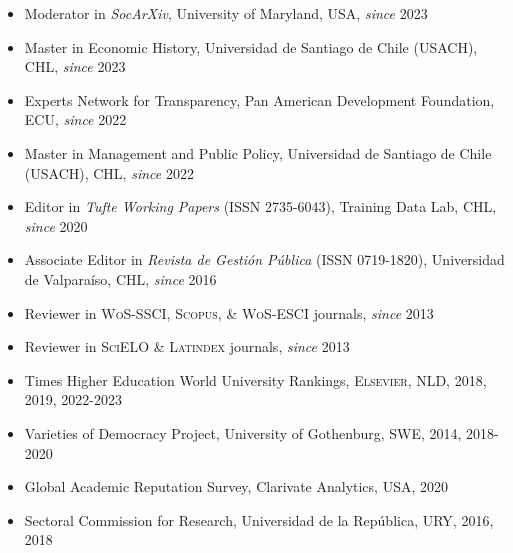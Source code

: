 





\begin{publications}

\begin{itemize}
\item{\small Moderator in {\itshape SocArXiv}, University of Maryland, USA, {\itshape since} 2023}
\item{\small Master in Economic History, Universidad de Santiago de Chile (USACH), CHL, {\itshape since} 2023}
\item{\small Experts Network for Transparency, Pan American Development Foundation, ECU, {\itshape since} 2022}
\item{\small Master in Management and Public Policy, Universidad de Santiago de Chile (USACH), CHL, {\itshape since} 2022}
\item{\small Editor in {\itshape Tufte Working Papers} (ISSN 2735-6043), Training Data Lab, CHL, {\itshape since} 2020}
\item{\small Associate Editor in {\itshape Revista de Gestión Pública} (ISSN 0719-1820), Universidad de Valparaíso, CHL, {\itshape since} 2016}
\item{\small Reviewer in {\scshape WoS-SSCI}, {\scshape Scopus}, \& {\scshape WoS-ESCI} journals, {\itshape since} 2013}
\item{\small Reviewer in {\scshape SciELO} \& {\scshape Latindex} journals, {\itshape since} 2013}
\item{\small Times Higher Education World University Rankings, {\scshape Elsevier}, NLD, 2018, 2019, 2022-2023}
\item{\small Varieties of Democracy Project, University of Gothenburg, SWE, 2014, 2018-2020}
\item{\small Global Academic Reputation Survey, Clarivate Analytics, USA, 2020}
\item{\small Sectoral Commission for Research, Universidad de la República, URY, 2016, 2018}
\end{itemize}

\vspace{1mm}
\end{publications}
